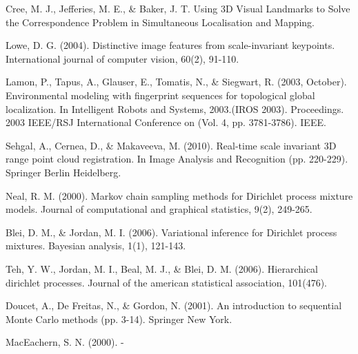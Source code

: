 \documentclass[twoside,hidelinks]{article}
\begin{document}
\begin{thebibliography}{9}
\newblock Cree, M. J., Jefferies, M. E., \& Baker, J. T. Using 3D Visual Landmarks to Solve the Correspondence Problem in Simultaneous Localisation and Mapping.

\newblock Lowe, D. G. (2004). Distinctive image features from scale-invariant keypoints. International journal of computer vision, 60(2), 91-110.

\newblock Lamon, P., Tapus, A., Glauser, E., Tomatis, N., \& Siegwart, R. (2003, October). Environmental modeling with fingerprint sequences for topological global localization. In Intelligent Robots and Systems, 2003.(IROS 2003). Proceedings. 2003 IEEE/RSJ International Conference on (Vol. 4, pp. 3781-3786). IEEE.


\newblock Sehgal, A., Cernea, D., \& Makaveeva, M. (2010). Real-time scale invariant 3D range point cloud registration. In Image Analysis and Recognition (pp. 220-229). Springer Berlin Heidelberg.

\newblock Neal, R. M. (2000). Markov chain sampling methods for Dirichlet process mixture models. Journal of computational and graphical statistics, 9(2), 249-265.

\newblock Blei, D. M., \& Jordan, M. I. (2006). Variational inference for Dirichlet process mixtures. Bayesian analysis, 1(1), 121-143.


\newblock Teh, Y. W., Jordan, M. I., Beal, M. J., \& Blei, D. M. (2006). Hierarchical dirichlet processes. Journal of the american statistical association, 101(476).

\newblock Doucet, A., De Freitas, N., \& Gordon, N. (2001). An introduction to sequential Monte Carlo methods (pp. 3-14). Springer New York.


\newblock MacEachern, S. N. (2000). -



\end{thebibliography}
\end{document}
